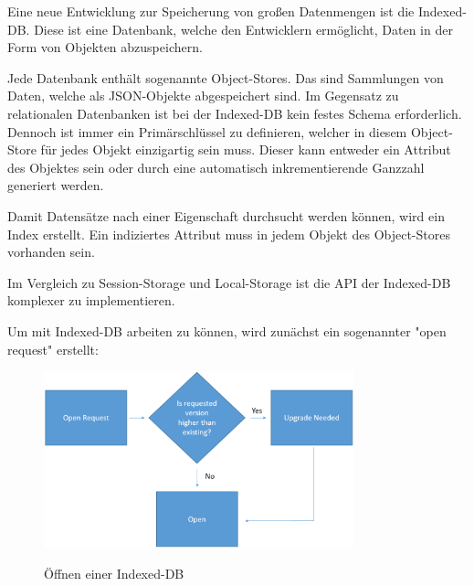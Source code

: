 \label{sec:indexeddb}

Eine neue Entwicklung zur Speicherung von großen Datenmengen ist die Indexed-DB. 
Diese ist eine Datenbank, welche den Entwicklern ermöglicht, Daten in der Form von Objekten abzuspeichern.

Jede Datenbank enthält sogenannte Object-Stores. Das sind Sammlungen von Daten, welche als JSON-Objekte abgespeichert sind. 
Im Gegensatz zu relationalen Datenbanken ist bei der Indexed-DB kein festes Schema erforderlich. 
Dennoch ist immer ein Primärschlüssel zu definieren, welcher in diesem Object-Store für jedes Objekt einzigartig sein muss.
Dieser kann entweder ein Attribut des Objektes sein oder durch eine automatisch inkrementierende Ganzzahl generiert werden. 

Damit Datensätze nach einer Eigenschaft durchsucht werden können, wird ein Index erstellt. 
Ein indiziertes Attribut muss in jedem Objekt des Object-Stores vorhanden sein.

Im Vergleich zu Session-Storage und Local-Storage ist die API der Indexed-DB komplexer zu implementieren.

Um mit Indexed-DB arbeiten zu können, wird zunächst ein sogenannter "open request" erstellt:


\begin{figure}[H]
    \centering
    \includegraphics[width=0.8\textwidth]{media/Webspeicher/openDb.png}
    \caption{Öffnen einer Indexed-DB}
    \cite{fig:openDB}
\end{figure}

